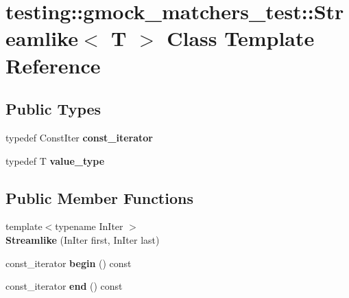 \hypertarget{classtesting_1_1gmock__matchers__test_1_1_streamlike}{}\section{testing\+:\+:gmock\+\_\+matchers\+\_\+test\+:\+:Streamlike$<$ T $>$ Class Template Reference}
\label{classtesting_1_1gmock__matchers__test_1_1_streamlike}
\subsection*{Public Types}
\begin{DoxyCompactItemize}
\item 
\mbox{\label{classtesting_1_1gmock__matchers__test_1_1_streamlike_a2eeb61dca56f70d0266f5f8ae91d2c7b}} 
typedef Const\+Iter {\bfseries const\+\_\+iterator}
\item 
\mbox{\label{classtesting_1_1gmock__matchers__test_1_1_streamlike_a7e2c2e021676c1ed5dea63cdd019661c}} 
typedef T {\bfseries value\+\_\+type}
\end{DoxyCompactItemize}
\subsection*{Public Member Functions}
\begin{DoxyCompactItemize}
\item 
\mbox{\label{classtesting_1_1gmock__matchers__test_1_1_streamlike_abf5560c86ad5d9563cb8f477f06046fe}} 
{\footnotesize template$<$typename In\+Iter $>$ }\\{\bfseries Streamlike} (In\+Iter first, In\+Iter last)
\item 
\mbox{\label{classtesting_1_1gmock__matchers__test_1_1_streamlike_a1ac125e14fd2358cdb727e0044ef7f01}} 
const\+\_\+iterator {\bfseries begin} () const
\item 
\mbox{\label{classtesting_1_1gmock__matchers__test_1_1_streamlike_a3e3aa6924974abcf7855dab1094bd860}} 
const\+\_\+iterator {\bfseries end} () const
\end{DoxyCompactItemize}
